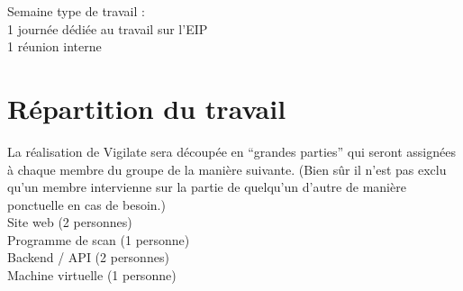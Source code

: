 Semaine type de travail :\\
1 journée dédiée au travail sur l’EIP\\
1 réunion interne\\

\section{Répartition du travail}
La réalisation de Vigilate sera découpée en “grandes parties” qui seront assignées à chaque membre du groupe de la manière suivante. (Bien sûr il n’est pas exclu qu’un membre intervienne sur la partie de quelqu’un d’autre de manière ponctuelle en cas de besoin.)\\
Site web (2 personnes)\\
Programme de scan (1 personne)\\
Backend / API (2 personnes)\\
Machine virtuelle (1 personne)\\
